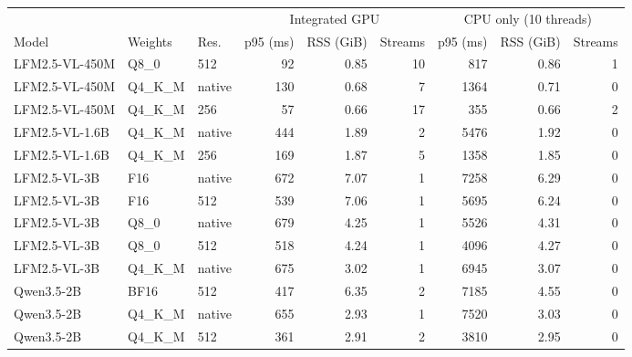 \begin{tabular}{lllrrrrrr}
\toprule
 & & & \multicolumn{3}{c}{Integrated GPU} & \multicolumn{3}{c}{CPU only (10 threads)} \\
\cmidrule(lr){4-6}\cmidrule(lr){7-9}
Model & Weights & Res. & p95 (ms) & RSS (GiB) & Streams & p95 (ms) & RSS (GiB) & Streams \\
\midrule
LFM2.5-VL-450M & Q8\_0 & 512 & 92 & 0.85 & 10 & 817 & 0.86 & 1 \\
LFM2.5-VL-450M & Q4\_K\_M & native & 130 & 0.68 & 7 & 1364 & 0.71 & 0 \\
LFM2.5-VL-450M & Q4\_K\_M & 256 & 57 & 0.66 & 17 & 355 & 0.66 & 2 \\
LFM2.5-VL-1.6B & Q4\_K\_M & native & 444 & 1.89 & 2 & 5476 & 1.92 & 0 \\
LFM2.5-VL-1.6B & Q4\_K\_M & 256 & 169 & 1.87 & 5 & 1358 & 1.85 & 0 \\
LFM2.5-VL-3B & F16 & native & 672 & 7.07 & 1 & 7258 & 6.29 & 0 \\
LFM2.5-VL-3B & F16 & 512 & 539 & 7.06 & 1 & 5695 & 6.24 & 0 \\
LFM2.5-VL-3B & Q8\_0 & native & 679 & 4.25 & 1 & 5526 & 4.31 & 0 \\
LFM2.5-VL-3B & Q8\_0 & 512 & 518 & 4.24 & 1 & 4096 & 4.27 & 0 \\
LFM2.5-VL-3B & Q4\_K\_M & native & 675 & 3.02 & 1 & 6945 & 3.07 & 0 \\
Qwen3.5-2B & BF16 & 512 & 417 & 6.35 & 2 & 7185 & 4.55 & 0 \\
Qwen3.5-2B & Q4\_K\_M & native & 655 & 2.93 & 1 & 7520 & 3.03 & 0 \\
Qwen3.5-2B & Q4\_K\_M & 512 & 361 & 2.91 & 2 & 3810 & 2.95 & 0 \\
\bottomrule
\end{tabular}
